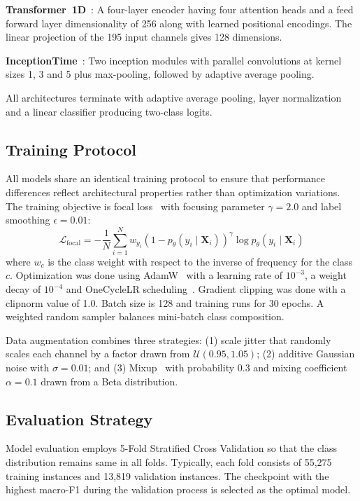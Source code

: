 \documentclass[3p,times,procedia]{elsarticle}
\begin{document}
\textbf{Transformer~1D}~\cite{vaswani2017attention}: A four-layer encoder having four attention heads and a feed forward layer dimensionality of 256 along with learned positional encodings. The linear projection of the 195 input channels gives 128 dimensions.

\textbf{InceptionTime}~\cite{fawaz2020inceptiontime}: Two inception modules with parallel convolutions at kernel sizes 1, 3 and 5 plus max-pooling, followed by adaptive average pooling.

All architectures terminate with adaptive average pooling, layer normalization and a linear classifier producing two-class logits.

\subsection{Training Protocol}

All models share an identical training protocol to ensure that performance differences reflect architectural properties rather than optimization variations. The training objective is focal loss~\cite{lin2017focal} with focusing parameter $\gamma = 2.0$ and label smoothing $\epsilon = 0.01$:
\begin{equation}
    \mathcal{L}_{\text{focal}} = -\frac{1}{N} \sum_{i=1}^{N} w_{y_i} (1 - p_\theta(y_i \mid \mathbf{X}_i))^\gamma \log p_\theta(y_i \mid \mathbf{X}_i)
\end{equation}
where $w_c$ is the class weight with respect to the inverse of frequency for the class $c$. Optimization was done using AdamW~\cite{loshchilov2019adamw} with a learning rate of $10^{-3}$, a weight decay of $10^{-4}$ and OneCycleLR scheduling~\cite{smith2019onecycle}. Gradient clipping was done with a clipnorm value of 1.0. Batch size is 128 and training runs for 30 epochs. A weighted random sampler balances mini-batch class composition.

Data augmentation combines three strategies: (1) scale jitter that randomly scales each channel by a factor drawn from $\mathcal{U}(0.95, 1.05)$; (2) additive Gaussian noise with $\sigma = 0.01$; and (3) Mixup~\cite{zhang2018mixup} with probability 0.3 and mixing coefficient $\alpha = 0.1$ drawn from a Beta distribution.

\subsection{Evaluation Strategy}

Model evaluation employs 5-Fold Stratified Cross Validation so that the class distribution remains same in all folds. Typically, each fold consists of 55,275 training instances and 13,819 validation instances. The checkpoint with the highest macro-F1 during the validation process is selected as the optimal model.
\end{document}
